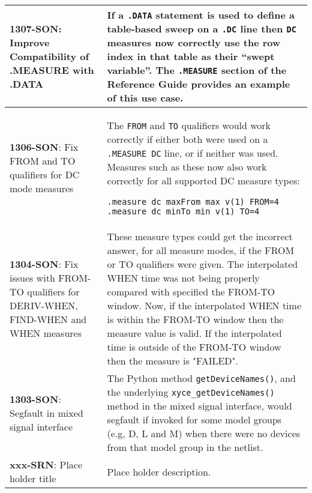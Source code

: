{\begin{longtable}[h] {>{\raggedright\small}m{2in}|>{\raggedright\let\\\tabularnewline\small}m{3.5in}}
\textbf{1307-SON}: Improve Compatibility of .MEASURE with .DATA &
If a \texttt{.DATA} statement is used to define a table-based sweep
on a \texttt{.DC} line then \texttt{DC} measures now correctly use
the row index in that table as their ``swept variable''.  The
\texttt{.MEASURE} section of the \Xyce{} Reference Guide provides
an example of this use case.
\\ \hline

\textbf{1306-SON}: Fix FROM and TO qualifiers for DC mode measures &
The \texttt{FROM} and \texttt{TO} qualifiers would work correctly if
either both were used on a \texttt{.MEASURE DC} line, or if neither
was used.  Measures such as these now also work correctly for all
supported DC measure types:
\begin{verbatim}
.measure dc maxFrom max v(1) FROM=4
.measure dc minTo min v(1) TO=4
\end{verbatim}
\\ \hline

\textbf{1304-SON}: Fix issues with FROM-TO qualifiers for DERIV-WHEN,
FIND-WHEN and WHEN measures & These measure types could get the incorrect
answer, for all measure modes, if the FROM or TO qualifiers
were given.  The interpolated WHEN time was not being properly compared with
specified the FROM-TO window.  Now, if the interpolated WHEN time is within
the FROM-TO window then the measure value is valid.  If the interpolated
time is outside of the FROM-TO window then the measure is "FAILED".
\\ \hline

\textbf{1303-SON}: Segfault in mixed signal interface &
The Python method \texttt{getDeviceNames()}, and the underlying
\texttt{xyce\_getDeviceNames()} method in the mixed signal interface,
would segfault if invoked for some model groups (e.g, D, L and M) when
there were no devices from that model group in the \Xyce{} netlist.
\\ \hline

\textbf{xxx-SRN}: Place holder title &
Place holder description.  \\ \hline
\end{longtable}
}
